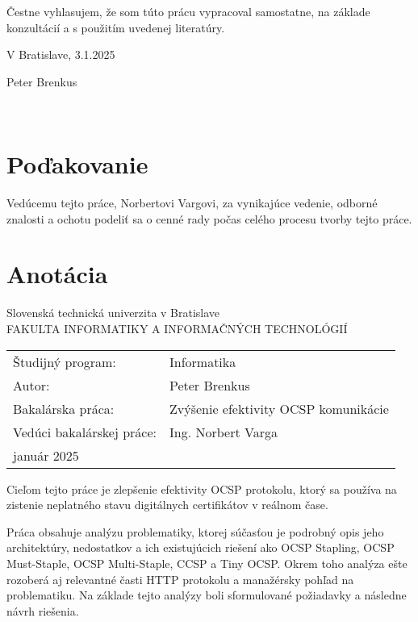 \documentclass[12pt, twoside]{book}
\def\mfrok{január 2025}
\def\mfnazov{Zvýšenie efektivity OCSP komunikácie}
\def\mfautor{Peter Brenkus}
\def\mfveduci{Ing. Norbert Varga}
\def\program{ Informatika }
\begin{document}
\vfill
\noindent
Čestne vyhlasujem, že som túto prácu vypracoval samostatne, na základe konzultácií a s použitím uvedenej literatúry.

\bigskip
\bigskip
\noindent
V Bratislave, 3.1.2025

{\raggedleft Peter Brenkus\quad \par}
\bigskip

\newpage\null\thispagestyle{empty}\newpage

\newpage
\thispagestyle{empty} 
~

\vfill
\noindent

\section*{Poďakovanie}
\bigskip
\noindent
Vedúcemu tejto práce, Norbertovi Vargovi, za vynikajúce vedenie, odborné znalosti a ochotu podeliť sa o cenné rady počas celého procesu tvorby tejto práce. 
\bigskip
\bigskip
\bigskip
\newpage\null\thispagestyle{empty}\newpage

\newpage 
\thispagestyle{empty}

\section*{Anotácia}
\noindent
Slovenská technická univerzita v Bratislave\\
FAKULTA INFORMATIKY A INFORMAČNÝCH TECHNOLÓGIÍ\\

\begin{tabular}{@{}ll}
Študijný program: & \program\bigskip
\bigskip  \\
Autor: & \mfautor \\
Bakalárska práca: &  \mfnazov \\
Vedúci bakalárskej práce: & \mfveduci \\
\mfrok
\end{tabular}

\bigskip
\bigskip 
\bigskip 
\noindent

Cieľom tejto práce je zlepšenie efektivity OCSP protokolu, ktorý sa používa na zistenie neplatného stavu digitálnych certifikátov v reálnom čase. 

Práca obsahuje analýzu problematiky, ktorej súčasťou je podrobný opis jeho architektúry, nedostatkov a ich existujúcich riešení ako OCSP Stapling, OCSP Must-Staple, OCSP Multi-Staple, CCSP a Tiny OCSP. Okrem toho analýza ešte rozoberá aj relevantné časti HTTP protokolu a manažérsky pohľad na problematiku. Na základe tejto analýzy boli sformulované požiadavky a následne návrh riešenia. 
\end{document}
